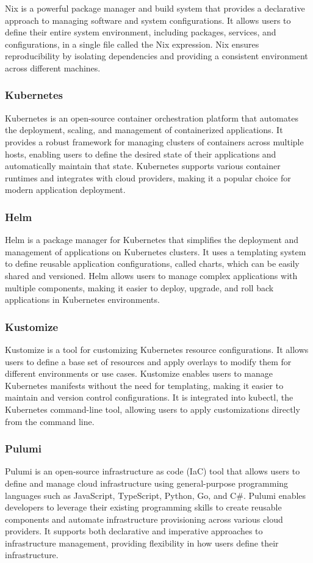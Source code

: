 Nix is a powerful package manager and build system that provides a declarative approach to managing software and system configurations. It allows users to define their entire system environment, including packages, services, and configurations, in a single file called the Nix expression. Nix ensures reproducibility by isolating dependencies and providing a consistent environment across different machines.

\subsubsection{Kubernetes}
\label{sec:kubernetes}
Kubernetes is an open-source container orchestration platform that automates the deployment, scaling, and management of containerized applications. It provides a robust framework for managing clusters of containers across multiple hosts, enabling users to define the desired state of their applications and automatically maintain that state. Kubernetes supports various container runtimes and integrates with cloud providers, making it a popular choice for modern application deployment.

\subsubsection{Helm}
\label{sec:helm}
Helm is a package manager for Kubernetes that simplifies the deployment and management of applications on Kubernetes clusters. It uses a templating system to define reusable application configurations, called charts, which can be easily shared and versioned. Helm allows users to manage complex applications with multiple components, making it easier to deploy, upgrade, and roll back applications in Kubernetes environments.

\subsubsection{Kustomize}
\label{sec:kustomize}
Kustomize is a tool for customizing Kubernetes resource configurations. It allows users to define a base set of resources and apply overlays to modify them for different environments or use cases. Kustomize enables users to manage Kubernetes manifests without the need for templating, making it easier to maintain and version control configurations. It is integrated into kubectl, the Kubernetes command-line tool, allowing users to apply customizations directly from the command line.

\subsubsection{Pulumi}
\label{sec:pulumi}
Pulumi is an open-source infrastructure as code (IaC) tool that allows users to define and manage cloud infrastructure using general-purpose programming languages such as JavaScript, TypeScript, Python, Go, and C#. Pulumi enables developers to leverage their existing programming skills to create reusable components and automate infrastructure provisioning across various cloud providers. It supports both declarative and imperative approaches to infrastructure management, providing flexibility in how users define their infrastructure.

